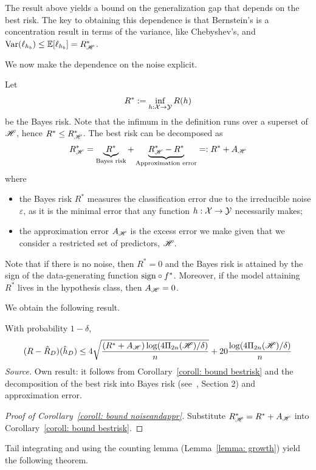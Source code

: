 \documentclass[reqno]{amsart}
\begin{document}
The result above yields a bound on the generalization gap that depends on the best risk. The key to obtaining this dependence is that Bernstein's is a concentration result in terms of the variance, like Chebyshev's, and $\operatorname{Var}(\ell_{h_b}) \le \mathbb{E}[\ell_{h_b}] = R^*_{\mathscr{H}}$. 

We now make the dependence on the noise explicit. 

Let
\[
R^* := \inf_{h:\mathcal{X}\to\mathcal{Y}} R(h)
\] 
be the Bayes risk. Note that the infimum in the definition runs over a superset of $\mathscr{H}$, hence $R^* \le R^*_{\mathscr{H}}$. The best risk can be decomposed as 
\[
R^*_{\mathscr{H}} = \underbrace{R^*}_{\text{Bayes risk}} + \underbrace{R^*_{\mathscr{H}} - R^*}_{\text{Approximation error}} =: R^* + A_{\mathscr{H}}
\]
where
\begin{itemize}
\item the Bayes risk $R^*$ measures the classification error due to the irreducible noise $\varepsilon$, as it is the minimal error that any function $h:\mathcal{X}\to\mathcal{Y}$ necessarily makes;
\item the approximation error $A_{\mathscr{H}}$ is the excess error we make given that we consider a restricted set of predictors, $\mathscr{H}$.
\end{itemize}
Note that if there is no noise, then $R^* = 0$ and the Bayes risk is attained by the sign of the data-generating function $\mathrm{sign} \circ f^*$. Moreover, if the model attaining $R^*$ lives in the hypothesis class, then $A_{\mathscr{H}} = 0$.  

We obtain the following result. 

\begin{corollary}\label{coroll: bound noiseandappr}
With probability $1-\delta$,
\[
    (R - \hat R_D)(\hat h_D) \le 4\sqrt{\frac{( R^*+A_{\mathscr{H}})\log(4\Pi_{2n}(\mathscr{H})/\delta)}{n}} + 20\frac{\log(4\Pi_{2n}(\mathscr{H})/\delta)}{n}
\]
\textnormal{\emph{Source.} Own result: it follows from Corollary~\ref{coroll: bound bestrisk} and the decomposition of the best risk into Bayes risk (see~\cite{boucheron2005theory}, Section 2) and approximation error.}

\begin{proof}[Proof of Corollary~\ref{coroll: bound noiseandappr}]
  Substitute $R^*_{\mathscr{H}} = R^* + A_{\mathscr{H}}$ into Corollary~\ref{coroll: bound bestrisk}.
\end{proof}
\end{corollary}

Tail integrating and using the counting lemma (Lemma~\ref{lemma: growth}) yield the following theorem. 
\end{document}
